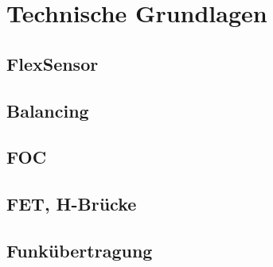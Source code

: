 \chapter{Technische Grundlagen}
\section{FlexSensor}
\section{Balancing}
\section{FOC}
\section{FET, H-Brücke}
\section{Funkübertragung}
